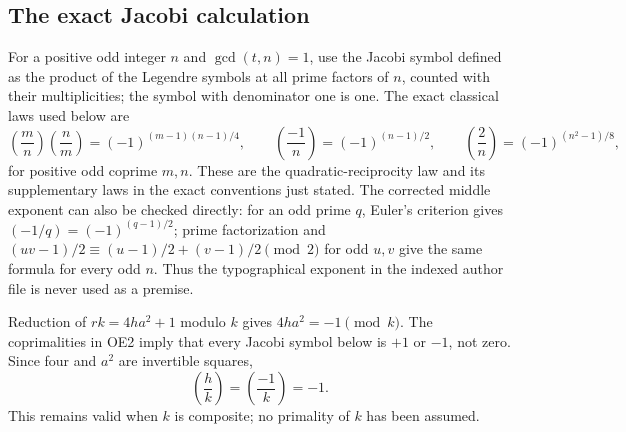 \subsection{The exact Jacobi calculation}
For a positive odd integer $n$ and $\gcd(t,n)=1$, use the Jacobi
symbol defined as the product of the Legendre symbols at all prime
factors of $n$, counted with their multiplicities; the symbol with
denominator one is one. The exact classical laws used below are
\begin{equation}
 \left(\frac mn\right)\left(\frac nm\right)
    =(-1)^{(m-1)(n-1)/4},\qquad
 \left(\frac{-1}{n}\right)=(-1)^{(n-1)/2},\qquad
 \left(\frac2n\right)=(-1)^{(n^2-1)/8},                 \tag{OE3}
\end{equation}
for positive odd coprime $m,n$. These are the quadratic-reciprocity
law and its supplementary laws in the exact conventions just stated.
The corrected middle exponent can also be checked directly: for an
odd prime $q$, Euler's criterion gives $(-1/q)=(-1)^{(q-1)/2}$;
prime factorization and
$(uv-1)/2\equiv(u-1)/2+(v-1)/2\pmod2$ for odd $u,v$
give the same formula for every odd $n$. Thus the typographical
exponent in the indexed author file is never used as a premise.

Reduction of $rk=4ha^2+1$ modulo $k$ gives $4ha^2=-1\pmod k$.
The coprimalities in OE2 imply that every Jacobi symbol below is
$+1$ or $-1$, not zero. Since four and $a^2$ are invertible squares,
\begin{equation}
 \left(\frac hk\right)
    =\left(\frac{-1}{k}\right)=-1.                    \tag{OE4}
\end{equation}
This remains valid when $k$ is composite; no primality of $k$ has
been assumed.

